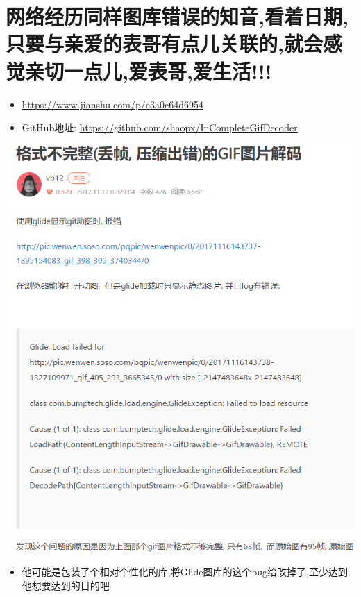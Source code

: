 \documentclass[9pt, b5paper]{article}
\begin{document}
\section{网络经历同样图库错误的知音,看着日期,只要与亲爱的表哥有点儿关联的,就会感觉亲切一点儿,爱表哥,爱生活!!!}
\label{sec-3}
\begin{itemize}
\item \url{https://www.jianshu.com/p/c3a0c64d6954}
\item GitHub地址: \url{https://github.com/shaopx/InCompleteGifDecoder}
\end{itemize}
\includegraphics[width=.9\linewidth]{./pic/readme_20221130_161506.png}
\begin{itemize}
\item 他可能是包装了个相对个性化的库,将Glide图库的这个bug给改掉了,至少达到他想要达到的目的吧
\end{itemize}
\end{document}
